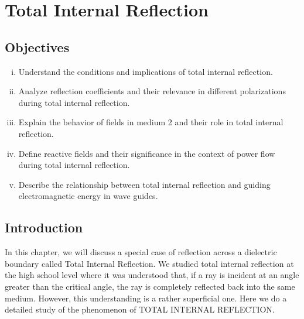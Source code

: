 \chapter{Total Internal Reflection}\label{lec:lec32}

\begin{mdframed}[backgroundcolor=lightblue, linewidth=1pt, hidealllines=true]
\section{Objectives}
\begin{enumerate}[(i)]
\item Understand the conditions and implications of total internal reflection.
\item Analyze reflection coefficients and their relevance in different polarizations during total internal reflection.
\item Explain the behavior of fields in medium 2 and their role in total internal reflection.
\item Define reactive fields and their significance in the context of power flow during total internal reflection.
\item Describe the relationship between total internal reflection and guiding electromagnetic energy in wave guides.
\end{enumerate}
\end{mdframed}

\section{Introduction}

In this chapter, we will discuss a special case of reflection across a dielectric boundary called Total Internal Reflection. We studied total internal reflection at the high school level where it was understood that, if a ray is incident at an angle greater than the critical angle, the ray is completely reflected back into the same medium. However, this understanding is a rather superficial one. Here we do a detailed study of the phenomenon of TOTAL INTERNAL REFLECTION.

